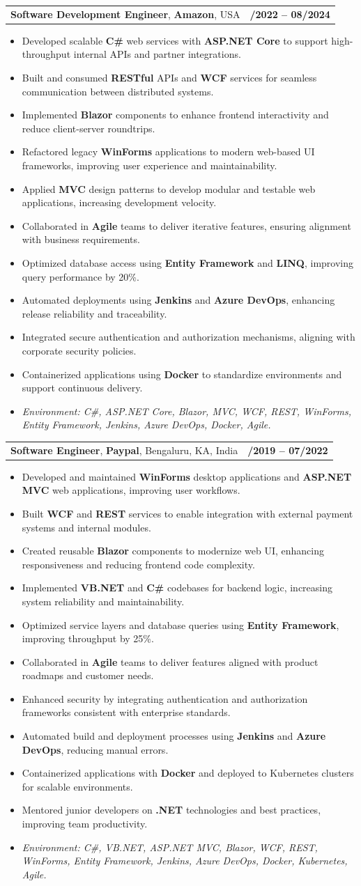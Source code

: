 \documentclass[letterpaper,11pt]{article}
\makeatletter
\newcommand{\resumeItem}[1]{
  \item\footnotesize{
    {#1 \vspace{-2pt}}
  }
}
\newcommand{\resumeSubheading}[4]{
  \vspace{-2pt}\item
    \begin{tabular*}{1.0\textwidth}[t]{l@{\extracolsep{\fill}}r}
      \textbf{\fontsize{10pt}{14pt}\selectfont #3}, \textbf{\fontsize{10pt}{14pt}\selectfont #1}, \fontsize{10pt}{14pt}\selectfont #4 & \textbf{\fontsize{10pt}{14pt}\selectfont #2} \\
    \end{tabular*}\vspace{-7pt}
}
\newcommand{\resumeItemListStart}{\begin{itemize}[leftmargin=*]}
\newcommand{\resumeItemListEnd}{\end{itemize}\vspace{-5pt}}
\makeatother
\begin{document}
\resumeSubheading
{Amazon}{10/2022 -- 08/2024}
{Software Development Engineer}{USA}
\resumeItemListStart
  \resumeItem{Developed scalable \textbf{C\#} web services with \textbf{ASP.NET Core} to support high-throughput internal APIs and partner integrations.}
  \resumeItem{Built and consumed \textbf{RESTful} APIs and \textbf{WCF} services for seamless communication between distributed systems.}
  \resumeItem{Implemented \textbf{Blazor} components to enhance frontend interactivity and reduce client-server roundtrips.}
  \resumeItem{Refactored legacy \textbf{WinForms} applications to modern web-based UI frameworks, improving user experience and maintainability.}
  \resumeItem{Applied \textbf{MVC} design patterns to develop modular and testable web applications, increasing development velocity.}
  \resumeItem{Collaborated in \textbf{Agile} teams to deliver iterative features, ensuring alignment with business requirements.}
  \resumeItem{Optimized database access using \textbf{Entity Framework} and \textbf{LINQ}, improving query performance by 20\%.}
  \resumeItem{Automated deployments using \textbf{Jenkins} and \textbf{Azure DevOps}, enhancing release reliability and traceability.}
  \resumeItem{Integrated secure authentication and authorization mechanisms, aligning with corporate security policies.}
  \resumeItem{Containerized applications using \textbf{Docker} to standardize environments and support continuous delivery.}
  \resumeItem{\textit{Environment: C\#, ASP.NET Core, Blazor, MVC, WCF, REST, WinForms, Entity Framework, Jenkins, Azure DevOps, Docker, Agile.}}
\resumeItemListEnd

\resumeSubheading
{Paypal}{08/2019 -- 07/2022}
{Software Engineer}{Bengaluru, KA, India}
\resumeItemListStart
  \resumeItem{Developed and maintained \textbf{WinForms} desktop applications and \textbf{ASP.NET MVC} web applications, improving user workflows.}
  \resumeItem{Built \textbf{WCF} and \textbf{REST} services to enable integration with external payment systems and internal modules.}
  \resumeItem{Created reusable \textbf{Blazor} components to modernize web UI, enhancing responsiveness and reducing frontend code complexity.}
  \resumeItem{Implemented \textbf{VB.NET} and \textbf{C\#} codebases for backend logic, increasing system reliability and maintainability.}
  \resumeItem{Optimized service layers and database queries using \textbf{Entity Framework}, improving throughput by 25\%.}
  \resumeItem{Collaborated in \textbf{Agile} teams to deliver features aligned with product roadmaps and customer needs.}
  \resumeItem{Enhanced security by integrating authentication and authorization frameworks consistent with enterprise standards.}
  \resumeItem{Automated build and deployment processes using \textbf{Jenkins} and \textbf{Azure DevOps}, reducing manual errors.}
  \resumeItem{Containerized applications with \textbf{Docker} and deployed to Kubernetes clusters for scalable environments.}
  \resumeItem{Mentored junior developers on \textbf{.NET} technologies and best practices, improving team productivity.}
  \resumeItem{\textit{Environment: C\#, VB.NET, ASP.NET MVC, Blazor, WCF, REST, WinForms, Entity Framework, Jenkins, Azure DevOps, Docker, Kubernetes, Agile.}}
\resumeItemListEnd
\end{document}
